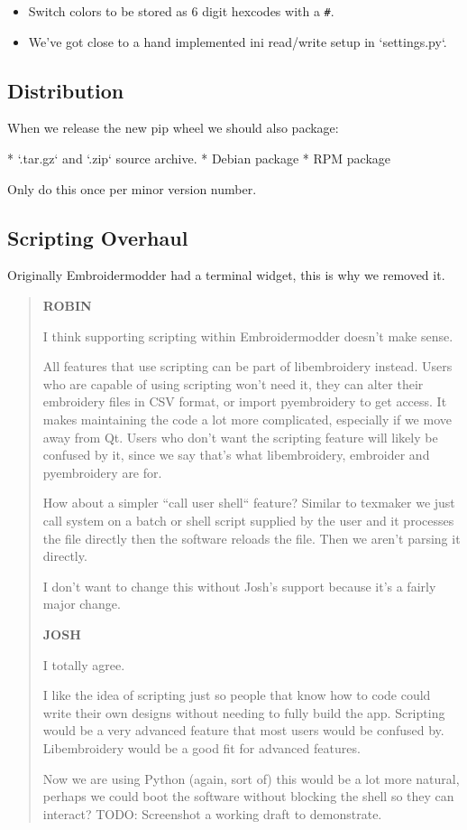\documentclass{report}
\begin{document}
\begin{itemize}
\item Switch colors to be stored as 6 digit hexcodes with a \texttt{\#}.
\item We've got close to a hand implemented ini read/write setup in `settings.py`.
\end{itemize}

\subsection{Distribution}

When we release the new pip wheel we should also package:

* `.tar.gz` and `.zip` source archive.
* Debian package
* RPM package

Only do this once per minor version number.

\subsection{Scripting Overhaul}

Originally Embroidermodder had a terminal widget, this is why we removed it.

\begin{quote}
\textbf{ROBIN}

I think supporting scripting within Embroidermodder doesn't make sense.

All features that use scripting can be part of libembroidery instead.
Users who are capable of using scripting won't need it, they can alter their embroidery files in CSV format, or import pyembroidery to get access.
It makes maintaining the code a lot more complicated, especially if we move away from Qt.
Users who don't want the scripting feature will likely be confused by it, since we say that's what libembroidery, embroider and pyembroidery are for.

How about a simpler ``call user shell`` feature? Similar to texmaker we just call system on a batch or shell script supplied by the user and it processes the file directly then the software reloads the file. Then we aren't parsing it directly.

I don't want to change this without Josh's support because it's a fairly major change.

\textbf{JOSH}

I totally agree.

I like the idea of scripting just so people that know how to code could write their own designs without needing to fully build the app. Scripting would be a very advanced feature that most users would be confused by. Libembroidery would be a good fit for advanced features.

Now we are using Python (again, sort of) this would be a lot more natural,
perhaps we could boot the software without blocking the shell so they can
interact? TODO: Screenshot a working draft to demonstrate.
\end{quote}
\end{document}
